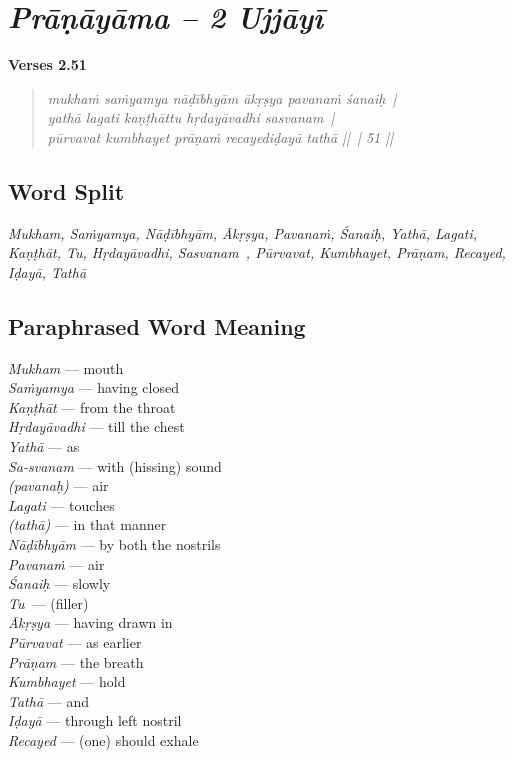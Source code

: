 \section*{\textit{Prāṇāyāma – 2 Ujjāyī}}

\noindent \textbf{Verses 2.51}

\begin{verse}
\textit{mukhaṁ saṁyamya nāḍībhyām ākṛṣya pavanaṁ śanaiḥ |\\
yathā lagati kaṇṭhāttu hṛdayāvadhi sasvanam |\\
pūrvavat kumbhayet prāṇaṁ recayediḍayā tathā || | 51 ||}
\end{verse}

\subsection*{Word Split}

\textit{Mukham, Saṁyamya, Nāḍībhyām, Ākṛṣya, Pavanaṁ, Śanaiḥ, Yathā, Lagati, Kaṇṭhāt, Tu, Hṛdayāvadhi, Sasvanam , Pūrvavat, Kumbhayet, Prāṇam, Recayed, Iḍayā, Tathā}

\subsection*{Paraphrased Word Meaning}

\begin{multicols}{2}
\textit{Mukham} --- mouth\\
\textit{Saṁyamya} --- having closed\\
\textit{Kaṇṭhāt} --- from the throat\\
\textit{Hṛdayāvadhi} --- till the chest\\
\textit{Yathā} --- as\\
\textit{Sa-svanam} --- with (hissing) sound\\
\textit{(pavanaḥ)} --- air\\
\textit{Lagati} --- touches\\
\textit{(tathā)} --- in that manner\\
\textit{Nāḍībhyām} --- by both the nostrils\\
\textit{Pavanaṁ} --- air\\
\textit{Śanaiḥ} --- slowly\\
\textit{Tu }--- (filler)\\
\textit{Ākṛṣya} --- having drawn in \\
\textit{Pūrvavat} --- as earlier \\
\textit{Prāṇam} --- the breath \\
\textit{Kumbhayet} --- hold \\
\textit{Tathā} --- and \\
\textit{Iḍayā} --- through left nostril\\
\textit{Recayed} --- (one) should exhale
\end{multicols}


